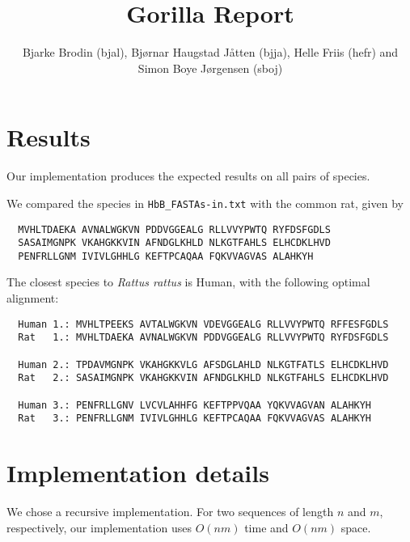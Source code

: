 \documentclass{tufte-handout}
\title{Gorilla Report}
\author{Bjarke Brodin (bjal), Bjørnar Haugstad Jåtten (bjja), Helle Friis (hefr) and Simon Boye Jørgensen (sboj)}
\begin{document}
  \maketitle

  \section{Results}

  Our implementation produces the expected results on all pairs of species.

  We compared the species in \verb!HbB_FASTAs-in.txt!
  with the common rat, given by

  \begin{verbatim}
  MVHLTDAEKA AVNALWGKVN PDDVGGEALG RLLVVYPWTQ RYFDSFGDLS
  SASAIMGNPK VKAHGKKVIN AFNDGLKHLD NLKGTFAHLS ELHCDKLHVD
  PENFRLLGNM IVIVLGHHLG KEFTPCAQAA FQKVVAGVAS ALAHKYH
  \end{verbatim}

  The closest species to \emph{Rattus rattus} is Human, with the following optimal alignment:


\medskip
  \begin{fullwidth}\small
  \begin{verbatim}
  Human 1.: MVHLTPEEKS AVTALWGKVN VDEVGGEALG RLLVVYPWTQ RFFESFGDLS 
  Rat   1.: MVHLTDAEKA AVNALWGKVN PDDVGGEALG RLLVVYPWTQ RYFDSFGDLS 
  
  Human 2.: TPDAVMGNPK VKAHGKKVLG AFSDGLAHLD NLKGTFATLS ELHCDKLHVD
  Rat   2.: SASAIMGNPK VKAHGKKVIN AFNDGLKHLD NLKGTFAHLS ELHCDKLHVD
    
  Human 3.: PENFRLLGNV LVCVLAHHFG KEFTPPVQAA YQKVVAGVAN ALAHKYH
  Rat   3.: PENFRLLGNM IVIVLGHHLG KEFTPCAQAA FQKVVAGVAS ALAHKYH
  \end{verbatim}
\end{fullwidth}



  \section{Implementation details}

  We chose a recursive implementation.
  For two sequences of length $n$ and $m$, respectively, our implementation uses $O(nm)$ time and
  $O(nm)$ space.
\end{document}
